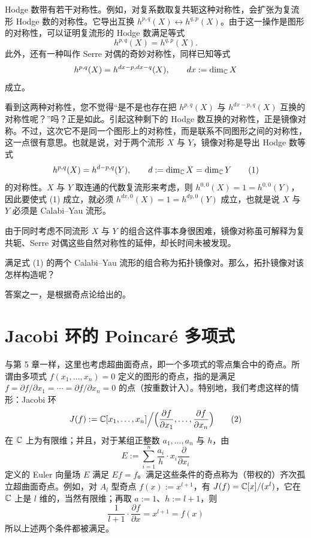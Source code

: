 Hodge 数带有若干对称性。例如，对复系数取复共轭这种对称性，会扩张为复流形 Hodge 数的对称性。它导出互换 $h^{p,q}(X)\leftrightarrow h^{q,p}(X)$。由于这一操作是图形的对称性，可以证明复流形的 Hodge 数满足等式
%
\[
  h^{p,q}(X)=h^{q,p}(X).
\]
%
此外，还有一种叫作 Serre 对偶的奇妙对称性，同样已知等式
%
\[
  h^{p,q}(X)=h^{dx-p,dx-q}(X),\qquad dx:=\dim_{\mathbb{C}}X
\]
%
成立。

看到这两种对称性，您不觉得“是不是也存在把 $h^{p,q}(X)$ 与 $h^{dx-p,q}(X)$ 互换的对称性呢？”吗？正是如此。引起这种剩下的 Hodge 数互换的对称性，正是镜像对称。不过，这次它不是同一个图形上的对称性，而是联系不同图形之间的对称性，这一点很有意思。也就是说，对于两个流形 $X$ 与 $Y$，镜像对称是导出 Hodge 数等式
%
\begin{equation}
  h^{p,q}(X)=h^{d-p,q}(Y),\qquad d:=\dim_{\mathbb{C}}X=\dim_{\mathbb{C}}Y
  \tag{1}
\end{equation}
%
的对称性。$X$ 与 $Y$ 取连通的代数复流形来考虑，则 $h^{0,0}(X)=1=h^{0,0}(Y)$，因此要使式 (1) 成立，就必须 $h^{dx,0}(X)=1=h^{dy,0}(Y)$ 成立，也就是说 $X$ 与 $Y$ 必须是 Calabi--Yau 流形。

由于同时考虑不同流形 $X$ 与 $Y$ 的组合这件事本身很困难，镜像对称虽可解释为复共轭、Serre 对偶这些自然对称性的延伸，却长时间未被发现。

满足式 (1) 的两个 Calabi--Yau 流形的组合称为拓扑镜像对。那么，拓扑镜像对该怎样构造呢？

答案之一，是根据奇点论给出的。

\section{Jacobi 环的 Poincaré 多项式}

与第 5 章一样，这里也考虑超曲面奇点，即一个多项式的零点集合中的奇点。所谓由多项式 $f(x_1,\dots,x_n)=0$ 定义的图形的奇点，指的是满足 $f=\partial f/\partial x_1=\cdots=\partial f/\partial x_n=0$ 的点（按重数计入）。特别地，我们考虑这样的情形：Jacobi 环
%
\begin{equation}
  J(f):=\mathbb{C}[x_1,\dots,x_n]\Big/\Big(\frac{\partial f}{\partial x_1},\dots,\frac{\partial f}{\partial x_n}\Big)
  \tag{2}
\end{equation}
%
在 $\mathbb{C}$ 上为有限维；并且，对于某组正整数 $a_1,\dots,a_n$ 与 $h$，由
%
\[
  E:=\sum_{i=1}^{n}\frac{a_i}{h}\cdot x_i\frac{\partial}{\partial x_i}
\]
%
定义的 Euler 向量场 $E$ 满足 $Ef=f$。满足这些条件的奇点称为（带权的）齐次孤立超曲面奇点。例如，对 $A_l$ 型奇点 $f(x):=x^{l+1}$，有 $J(f)=\mathbb{C}[x]/(x^l)$，它在 $\mathbb{C}$ 上是 $l$ 维的，当然有限维；再取 $a:=1$、$h:=l+1$，则%
%
\[
  \frac{1}{l+1}\cdot\frac{\partial f}{\partial x}=x^{l+1}=f(x)
\]
%
所以上述两个条件都被满足。


